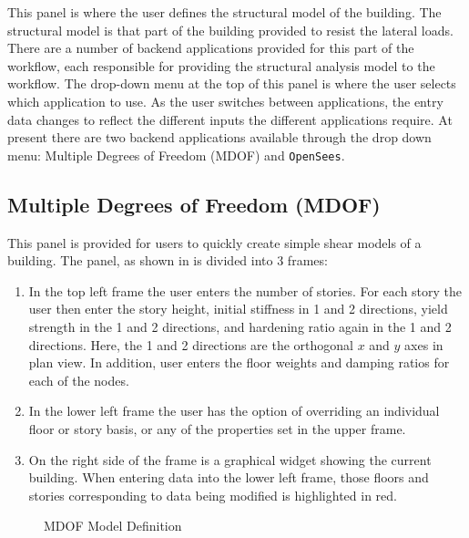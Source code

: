 This panel is where the user defines the structural model of the
building. The structural model is that part of the building provided
to resist the lateral loads. There are a number of backend
applications provided for this part of the workflow, each responsible
for providing the structural analysis model to the workflow. The
drop-down menu at the top of this panel is where the user selects
which application to use. As the user switches between applications,
the entry data changes to reflect the different inputs the different
applications require. At present there are two backend applications
available through the drop down menu: Multiple Degrees of Freedom
(MDOF) and \texttt{OpenSees}.

\subsection{Multiple Degrees of Freedom (MDOF)}

This panel is provided for users to quickly create simple shear models
of a building. The panel, as shown in  is divided
into 3 frames:
\begin{enumerate}
\item In the top left frame the user enters the number of stories. For
  each story the user then enter the story height, initial stiffness in
  1 and 2 directions, yield strength in the 1 and 2 directions, and
  hardening ratio again in the 1 and 2 directions. Here, the 1 and 2 directions
  are the orthogonal $x$ and $y$ axes in plan view. In addition, user enters
  the floor weights and damping ratios for each of the nodes.
\item In the lower left frame the user has the option of overriding an
  individual floor or story basis, or any of the properties set in the
  upper frame.
\item On the right side of the frame is a graphical widget showing the
  current building. When entering data into the lower left frame,
  those floors and stories corresponding to data being modified is
  highlighted in red.
\end{enumerate}

\begin{figure}[!htbp]
  \caption{MDOF Model Definition}
  \label{fig:mdof}
\end{figure}

